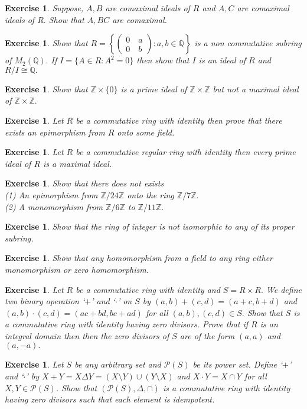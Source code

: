 \documentclass[11pt]{amsart}
\newtheorem{ex}[theorem]{Exercise}
\newcommand{\QQ}{\mathbb Q}
\newcommand{\ZZ}{\mathbb Z}
\begin{document}
\begin{ex}
Suppose, $A,B$ are comaximal ideals of $R$ and $A,C$ are comaximal ideals of $R.$ Show that $A,BC$ are comaximal.
\end{ex}
\begin{ex}
Show that $R=\left\lbrace \begin{pmatrix}
0\quad a\\
0\quad b
\end{pmatrix}:a,b\in {\QQ}\right\rbrace$ is a non commutative subring of $M_2({\QQ}).$ If $I=\{A\in R:A^2=0\}$ then show that $I$ is an ideal of $R$ and $R/I\cong {\QQ}.$
\end{ex}
\begin{ex}
Show that ${\ZZ}\times \{0\}$ is a prime ideal of ${\ZZ}\times {\ZZ}$ but not a maximal ideal of ${\ZZ}\times {\ZZ}.$
\end{ex}
\begin{ex}
Let $R$ be a commutative ring with identity then prove that there exists an epimorphism from $R$ onto some field.
\end{ex}
\begin{ex}
Let $R$ be a commutative regular ring with identity then every prime ideal of $R$ is a maximal ideal.
\end{ex}
\begin{ex}
Show that there does not exists \\
(1) An epimorphism from ${\ZZ}/24{\ZZ}$ onto the ring ${\ZZ}/7{\ZZ}.$\\
(2) A monomorphism from ${\ZZ}/6{\ZZ}$ to ${\ZZ}/11{\ZZ}.$
\end{ex}
\begin{ex}
Show that the ring of integer is not isomorphic to any of its proper subring.
\end{ex}
\begin{ex}
Show that any homomorphism from a field to any ring either monomorphism or zero homomorphism.
\end{ex}
\begin{ex}
Let $R$ be a commutative ring with identity and $S=R\times R.$ We define two binary operation `$+$' and `$\cdot$' on $S$ by $(a,b)+(c,d)=(a+c,b+d)$ and $(a,b)\cdot (c,d)=(ac+bd,bc+ad)$ for all $(a,b),(c,d)\in S.$ Show that $S$ is a commutative ring with identity having zero divisors. Prove that if $R$ is an integral domain then then the zero divisors of $S$ are of the form $(a,a)$ and $(a,-a).$
\end{ex}
\begin{ex}
Let $S$ be any arbitrary set and $\mathcal{P}(S)$ be its power set. Define `$+$' and `$\cdot$' by $X+Y=X\Delta Y=(X\setminus Y)\cup(Y\setminus X)$ and $X\cdot Y=X\cap Y$ for all $X,Y\in \mathcal{P}(S)$. Show that $(\mathcal{P}(S), \Delta, \cap)$ is a commutative ring with identity having zero divisors such that each element is idempotent.
\end{ex}
\end{document}
